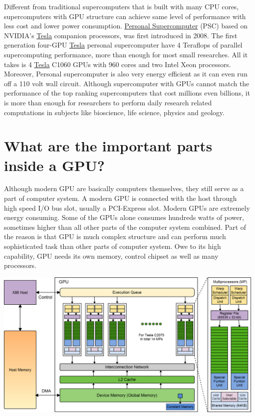\documentclass[letterpaper,10pt,english]{sphinxmanual}
\begin{document}
Different from traditional supercomputers that is built with many CPU cores, supercomputers with GPU structure can achieve same level of performance with less cost and lower power consumption. \href{http://en.wikipedia.org/wiki/Nvidia\_Tesla\_\_Personal\_Supercomputer}{Personal Supercomputer} (PSC) based on NVIDIA's \href{http://www.nvidia.com/object/tesla-supercomputing-solutions.html}{Tesla} companion processors, was first introduced in 2008. The first generation four-GPU \href{http://www.nvidia.com/object/tesla-supercomputing-solutions.html}{Tesla} personal supercomputer have 4 Teraflops of parallel supercomputing performance, more than enough for most small researches. All it takes is 4 \href{http://www.nvidia.com/object/tesla-supercomputing-solutions.html}{Tesla} C1060 GPUs with 960 cores and two Intel Xeon processors. Moreover, Personal supercomputer is also very energy efficient as it can even run off a 110 volt wall circuit. Although supercomputer with GPUs cannot match the performance of the top ranking supercomputers that cost millions even billions, it is more than enough for researchers to perform daily research related computations in subjects like bioscience, life science, physics and geology.


\section{What are the important parts inside a GPU?}
\label{Introduction/Introduction:tesla}\label{Introduction/Introduction:what-are-the-important-parts-inside-a-gpu}
Although modern GPU are basically computers themselves, they still serve as a part of computer system. A modern GPU is connected with the host through high speed I/O bus slot, usually a PCI-Express slot. Modern GPUs are extremely energy consuming. Some of the GPUs alone consumes hundreds watts of power, sometimes higher than all other parts of the computer system combined. Part of the reason is that GPU is much complex  structure and can perform much sophisticated task than other parts of computer system. Owe to its high capability, GPU needs its own memory, control chipset as well as many processors.

{\hfill\includegraphics{CUDA.png}\hfill}
\end{document}
